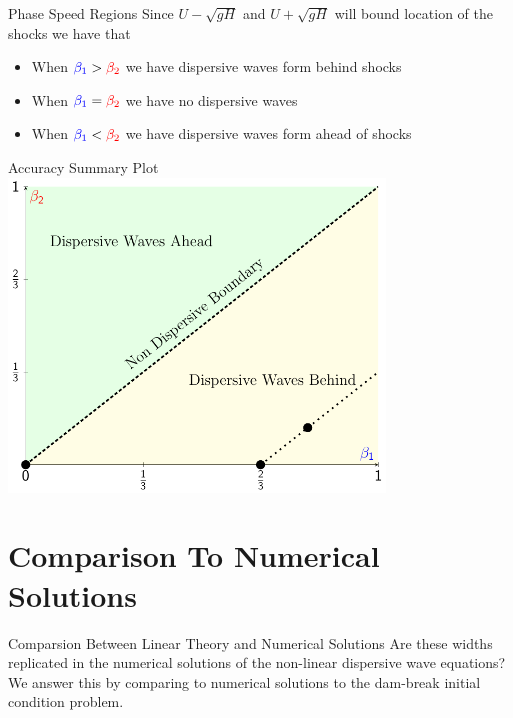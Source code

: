 \documentclass[pdf]{beamer}
\begin{document}
\begin{frame}{Phase Speed Regions }
Since $U - \sqrt{gH} $  and $U +  \sqrt{gH} $ will bound location of the shocks we have that
\begin{itemize}
	\item When ${\color{blue}\beta_1 } > {\color{red}\beta_2 }$ we have dispersive waves form behind shocks
	\item When ${\color{blue}\beta_1 } = {\color{red}\beta_2 }$ we have no dispersive waves
	\item When ${\color{blue}\beta_1 } < {\color{red}\beta_2 }$ we have dispersive waves form ahead of shocks 
\end{itemize}
\end{frame}
\begin{frame}{Accuracy Summary Plot}
\centering
\includegraphics[width=0.75\textwidth]{./Pics/Tex/Explanatory/RegionsPlot/AccuracySummaryWithRegions.pdf}
\end{frame}

\section{Comparison To Numerical Solutions}
\begin{frame}{Comparsion Between Linear Theory and Numerical Solutions}
Are these widths replicated in the numerical solutions of the non-linear dispersive wave equations? \newline \newline
We answer this by comparing to numerical solutions to the dam-break initial condition problem. 
\end{frame}
\end{document}
